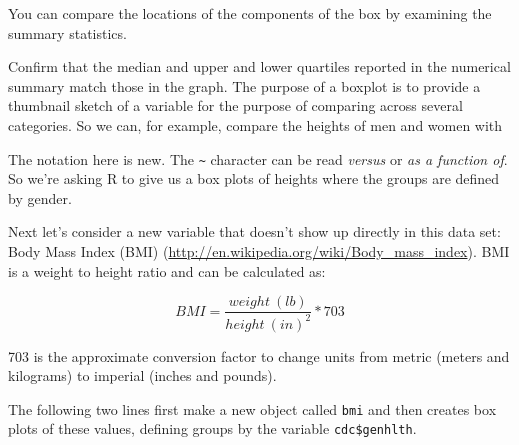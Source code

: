 \documentclass[]{book}
\newenvironment{Shaded}{\begin{snugshade}}{\end{snugshade}}
\newcommand{\KeywordTok}[1]{\textcolor[rgb]{0.13,0.29,0.53}{\textbf{#1}}}
\newcommand{\DecValTok}[1]{\textcolor[rgb]{0.00,0.00,0.81}{#1}}
\newcommand{\StringTok}[1]{\textcolor[rgb]{0.31,0.60,0.02}{#1}}
\newcommand{\OperatorTok}[1]{\textcolor[rgb]{0.81,0.36,0.00}{\textbf{#1}}}
\newcommand{\NormalTok}[1]{#1}
\theoremstyle{definition}
\theoremstyle{definition}
\theoremstyle{definition}
\theoremstyle{remark}
\begin{document}
\begin{Shaded}
\end{Shaded}

You can compare the locations of the components of the box by examining
the summary statistics.

\begin{Shaded}
\end{Shaded}

Confirm that the median and upper and lower quartiles reported in the
numerical summary match those in the graph. The purpose of a boxplot is
to provide a thumbnail sketch of a variable for the purpose of comparing
across several categories. So we can, for example, compare the heights
of men and women with

\begin{Shaded}
\end{Shaded}

The notation here is new. The \texttt{\textasciitilde{}} character can
be read \emph{versus} or \emph{as a function of}. So we're asking R to
give us a box plots of heights where the groups are defined by gender.

Next let's consider a new variable that doesn't show up directly in this
data set: Body Mass Index (BMI)
(\url{http://en.wikipedia.org/wiki/Body_mass_index}). BMI is a weight to
height ratio and can be calculated as:

\[ BMI = \frac{weight~(lb)}{height~(in)^2} * 703 \]

703 is the approximate conversion factor to change units from metric
(meters and kilograms) to imperial (inches and pounds).

The following two lines first make a new object called \texttt{bmi} and
then creates box plots of these values, defining groups by the variable
\texttt{cdc\$genhlth}.

\begin{Shaded}
\end{Shaded}
\end{document}
